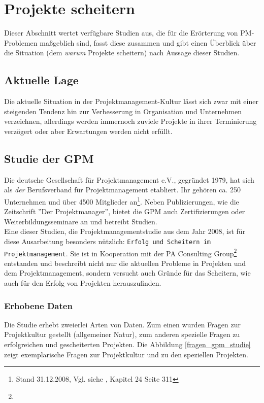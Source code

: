 \documentclass[12pt]{scrartcl}
\begin{document}
\pagebreak
\section{Projekte scheitern}

Dieser Abschnitt wertet verfügbare Studien aus, die für die Erörterung von PM-Problemen maßgeblich sind, fasst diese zusammen und gibt einen Überblick über die Situation (dem \textit{warum} Projekte scheitern) nach Aussage dieser Studien. 

\subsection{Aktuelle Lage}
Die aktuelle Situation in der Projektmanagement-Kultur lässt sich zwar mit einer steigenden Tendenz hin zur Verbesserung in Organisation und Unternehmen verzeichnen, allerdings werden immernoch zuviele Projekte in ihrer Terminierung verzögert oder aber Erwartungen werden nicht erfüllt.

\subsection{Studie der GPM}
\label{studies_gpm}

Die deutsche Gesellschaft für Projektmanagement e.V., gegründet 1979, hat sich als \textit{der} Berufsverband für Projektmanagement etabliert. Ihr gehören ca. 250 Unternehmen und  über 4500 Mitglieder an\footnote{Stand 31.12.2008, Vgl. siehe \cite{proj_zum_erfolg_fuehren}, Kapitel 24 Seite 311}. Neben Publizierungen, wie die Zeitschrift ''Der Projektmanager'', bietet die GPM auch Zertifizierungen oder Weiterbildungsseminare an und betreibt Studien. \\
Eine dieser Studien, die Projektmanagementstudie aus dem Jahr 2008, ist für diese Ausarbeitung besonders nützlich: \texttt{Erfolg und Scheitern im Projektmanagement}. Sie ist in Kooperation mit der PA Consulting Group\footnote{} entstanden und beschreibt nicht nur die aktuellen Probleme in Projekten und dem Projektmanagement, sondern versucht auch Gründe für das Scheitern, wie auch für den Erfolg von Projekten herauszufinden. 

\subsubsection{Erhobene Daten}
\label{erhobene_daten}
Die Studie erhebt zweierlei Arten von Daten. Zum einen wurden Fragen zur Projektkultur gestellt (allgemeiner Natur), zum anderen spezielle Fragen zu erfolgreichen und gescheiterten Projekten. Die Abbildung \ref{fragen_gpm_studie} zeigt exemplarische Fragen zur Projektkultur und zu den speziellen Projekten. 
\end{document}
